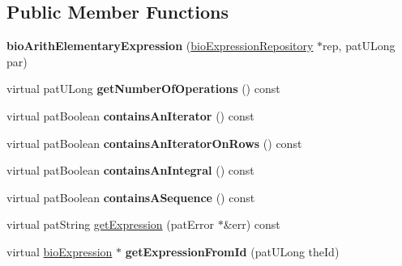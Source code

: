 \subsection*{Public Member Functions}
\begin{DoxyCompactItemize}
\item 
\mbox{\label{classbio_arith_elementary_expression_a7e6fce4a237dae9d0a002273f1144c0f}} 
{\bfseries bio\+Arith\+Elementary\+Expression} (\hyperlink{classbio_expression_repository}{bio\+Expression\+Repository} $\ast$rep, pat\+U\+Long par)
\item 
\mbox{\label{classbio_arith_elementary_expression_ad0580d3a2ab21f301a131e187ee504f3}} 
virtual pat\+U\+Long {\bfseries get\+Number\+Of\+Operations} () const
\item 
\mbox{\label{classbio_arith_elementary_expression_a5c1548f90e0ce54653c7b319ed260c2e}} 
virtual pat\+Boolean {\bfseries contains\+An\+Iterator} () const
\item 
\mbox{\label{classbio_arith_elementary_expression_aaea78451d997c2b3b3e911e93118d4d1}} 
virtual pat\+Boolean {\bfseries contains\+An\+Iterator\+On\+Rows} () const
\item 
\mbox{\label{classbio_arith_elementary_expression_aa994776430d8af57c9e964ce296e8da1}} 
virtual pat\+Boolean {\bfseries contains\+An\+Integral} () const
\item 
\mbox{\label{classbio_arith_elementary_expression_ac7326fe2e8d9396cd56e45219be0867e}} 
virtual pat\+Boolean {\bfseries contains\+A\+Sequence} () const
\item 
virtual pat\+String \hyperlink{classbio_arith_elementary_expression_a9293635c83789f547b5642855f8c8f16}{get\+Expression} (pat\+Error $\ast$\&err) const
\item 
\mbox{\label{classbio_arith_elementary_expression_a17e6a689c2b513c05460693f7328376b}} 
virtual \hyperlink{classbio_expression}{bio\+Expression} $\ast$ {\bfseries get\+Expression\+From\+Id} (pat\+U\+Long the\+Id)

\end{DoxyCompactItemize}
